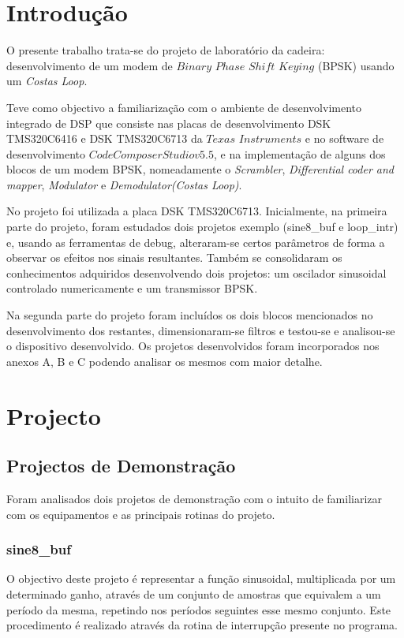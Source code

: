 \documentclass[11pt]{article}
\numberwithin{equation}{section}
\begin{document}
\section{Introdução}
O presente trabalho trata-se do projeto de laboratório da cadeira: desenvolvimento de um modem de $Binary$ $Phase$ $Shift$ $Keying$ (BPSK) usando um \textit{Costas Loop}. 

Teve como objectivo a familiarização com o ambiente de desenvolvimento integrado de DSP que consiste nas placas de desenvolvimento DSK TMS320C6416 e DSK TMS320C6713 da $Texas$ $Instruments$ e no software de desenvolvimento $Code Composer Studio v5.5$, e na implementação de alguns dos blocos de um modem BPSK, nomeadamente o \textit{Scrambler},  \textit{Differential coder and mapper}, \textit{Modulator} e \textit{Demodulator(Costas Loop)}.

No projeto foi utilizada a placa DSK TMS320C6713. Inicialmente, na primeira parte do projeto, foram estudados dois projetos exemplo (sine8\_buf e loop\_intr) e, usando as ferramentas de debug, alteraram-se certos parâmetros de forma a observar os efeitos nos sinais resultantes. Também se consolidaram os conhecimentos adquiridos desenvolvendo dois projetos: um oscilador sinusoidal controlado numericamente e um transmissor BPSK. 

Na segunda parte do projeto foram incluídos os dois blocos mencionados no desenvolvimento dos restantes, dimensionaram-se filtros e testou-se e analisou-se o dispositivo desenvolvido. Os projetos desenvolvidos foram incorporados nos anexos A, B e C podendo analisar os mesmos com maior detalhe.

\section{Projecto}

\subsection{Projectos de Demonstração}
Foram analisados dois projetos de demonstração com o intuito de familiarizar com os equipamentos e as principais rotinas do projeto.
\subsubsection{sine8\_buf}
\label{sec:sine8}
O objectivo deste projeto é representar a função sinusoidal, multiplicada por um determinado ganho, através de um conjunto de amostras que equivalem a um período da mesma, repetindo nos períodos seguintes esse mesmo conjunto. Este procedimento é realizado através da rotina de interrupção presente no programa. 
\end{document}
